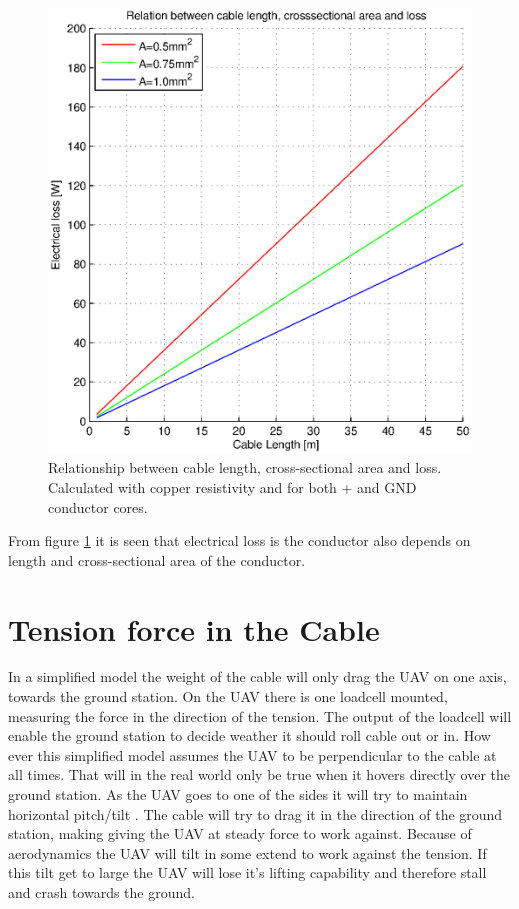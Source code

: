 \begin{figure}[H]
\centering
\includegraphics[scale=0.6]{graphics/matlab/cable_relation_lenght_loss_crosssection.eps}
\caption{Relationship between cable length, cross-sectional area and loss. Calculated with copper resistivity and for both + and GND conductor cores.}
\label{fig:relationship_loss_length}
\end{figure}

From figure \ref{fig:relationship_loss_length} it is seen that electrical loss is the conductor also depends on length and cross-sectional area of the conductor. 


\section{Tension force in the Cable}
In a simplified model the weight of the cable will only drag the UAV on one axis, towards the ground station. On the UAV there is one loadcell mounted, measuring the force in the direction of the tension. The output of the loadcell will enable the ground station to decide weather it should roll cable out or in. How ever this simplified model assumes the UAV to be perpendicular to the cable at all times. 
That will in the real world only be true when it hovers directly over the ground station. As the UAV goes to one of the sides it will try to maintain horizontal pitch/tilt . The cable will try to drag it in the direction of the ground station, making giving the UAV at steady force to work against. Because of aerodynamics the UAV will tilt in some extend to work against the tension. If this tilt get to large the UAV will lose it's lifting capability and therefore stall and crash towards the ground.   

